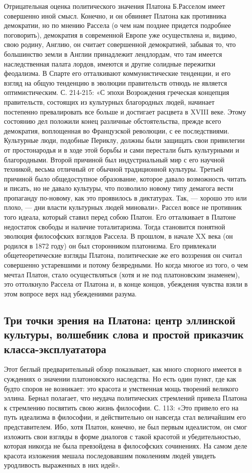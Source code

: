 Отрицательная оценка политического значения Платона Б.Расселом имеет
совершенно иной смысл. Конечно, и он обвиняет Платона как противника
демократии, но по мнению Рассела (о чем нам позднее придется подробнее
поговорить), демократия в современной Европе уже осуществлена и,
видимо, свою родину, Англию, он считает совершенной демократией,
забывая то, что большинство земли в Англии принадлежит лендлордам, что
там имеется наследственная палата лордов, имеются и другие солидные
пережитки феодализма. В Спарте его отталкивают коммунистические
тенденции, и его взгляд на общую тенденцию в эволюции правительств
отнюдь не является оптимистическим. С. 214-215: «С эпохи Возрождения
греческая концепция правительств, состоящих из культурных благородных
людей, начинает постепенно превалировать все больше и достигает
расцвета в XVIII веке. Этому состоянию дел положили конец различные
обстоятельства, прежде всего демократия, воплощенная во Французской
революции, с ее последствиями. Культурные люди, подобные Периклу,
должны были защищать свои привилегии от простонародья и в ходе этой
борьбы и сами перестали быть культурными и благородными. Второй
причиной был индустриальный мир с его научной техникой, весьма
отличный от обычной традиционной культуры. Третьей причиной было
общедоступное образование, которое давало возможность читать и писать,
но не давало культуры, что позволило новому типу демагога вести
пропаганду по-новому, как это проявилось в диктатурах. Так, --- хорошо
это или плохо, --- дни власти культурных людей миновали». Рассел вовсе
не противник того идеала, который ставил перед собою Платон. Его
отталкивает в Платоне недостаток свободы и наличие тоталитаризма.
Тогда становится понятной эволюция философских взглядов Рассела. В
прошлом, в начале XX века (он родился в 1872 году) он был сторонником
платонизма. Его привлекали общетеоретические взгляды Платона,
политические же его воззрения он считал совершенно устаревшими и
потому безвредными. Но когда многое из того, о чем мечтал Платон,
стало осуществляться (хотя и не под платоновским знаменем), это
оттолкнуло Рассела от Платона и, в конце концов, убеждения чувства
взяли в этом вопросе верх над убеждениями разума.

\subsection{Три точки зрения на Платона: центр эллинской культуры,
волшебник слова и простой приказчик класса-эксплуататора}

Этот беглый предварительный обзор показывает, как много спорного
имеется в суждениях о значении платоновского наследства. Но есть один
пункт, где как будто споров не возникает: это красота и умственная
мощь творений великого эллина. Бернал полагает, что неудача
политических стремлений привела Платона к стремлению посвятить свою
жизнь философии. С. 113: «Это привело его на путь идеализма в
философии, и действительно он навсегда стал величайшим его
представителем. Ибо, хотя Платон, конечно, не был первым идеалистом,
он смог изложить свои взгляды в форме диалогов с такой красотой и
убедительностью, которая никогда не была превзойдена в философских
сочинениях. На самом деле красота изложения мешала последовавшим
поколениям людей увидеть уродливость выраженных в них идей».

